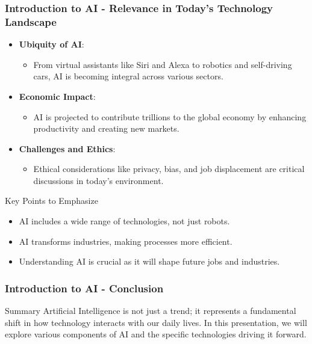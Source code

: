 \documentclass{beamer}
\begin{document}
\begin{frame}[fragile]
    \frametitle{Introduction to AI - Relevance in Today's Technology Landscape}
    \begin{itemize}
        \item \textbf{Ubiquity of AI}: 
            \begin{itemize}
                \item From virtual assistants like Siri and Alexa to robotics and self-driving cars, AI is becoming integral across various sectors.
            \end{itemize}
        
        \item \textbf{Economic Impact}: 
            \begin{itemize}
                \item AI is projected to contribute trillions to the global economy by enhancing productivity and creating new markets.
            \end{itemize}

        \item \textbf{Challenges and Ethics}: 
            \begin{itemize}
                \item Ethical considerations like privacy, bias, and job displacement are critical discussions in today’s environment.
            \end{itemize}
    \end{itemize}

    \begin{block}{Key Points to Emphasize}
        \begin{itemize}
            \item AI includes a wide range of technologies, not just robots.
            \item AI transforms industries, making processes more efficient.
            \item Understanding AI is crucial as it will shape future jobs and industries.
        \end{itemize}
    \end{block}
\end{frame}

\begin{frame}[fragile]
    \frametitle{Introduction to AI - Conclusion}
    \begin{block}{Summary}
        Artificial Intelligence is not just a trend; it represents a fundamental shift in how technology interacts with our daily lives. In this presentation, we will explore various components of AI and the specific technologies driving it forward.
    \end{block}
\end{frame}
\end{document}
